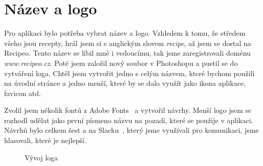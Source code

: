 \section{Název a logo}
Pro aplikaci bylo potřeba vybrat název a logo. Vzhledem k tomu, že středem všeho jsou recepty, hrál jsem si s anglickým slovem
\emph{recipe}, až jsem se dostal na Recipeo. Tento název se líbil mně i vedoucímu, tak jsme zaregistrovali doménu \emph{www.recipeo.cz}.
Poté jsem založil nový soubor v Photoshopu a pustil se do vytváření loga. Chtěl jsem vytvořit jedno s celým názvem, které bychom použili
na úvodní stránce a jedno menší, které by se dalo využít jako ikona aplikace, favicon atd.

Zvolil jsem několik fontů z Adobe Fonts~\cite{AdobeFonts} a vytvořil návrhy. Menší logo jsem se rozhodl udělat jako první písmeno názvu na pozadí,
které se použije v aplikaci. Návrhů bylo celkem šest a na Slacku~\cite{Slack}, který jsme využívali pro komunikaci, jsme hlasovali, které je nejlepší.

\begin{figure}[h]
    \centering
    \hfill
    \hfill
    \hfill
    \caption{Vývoj loga}
\end{figure}

